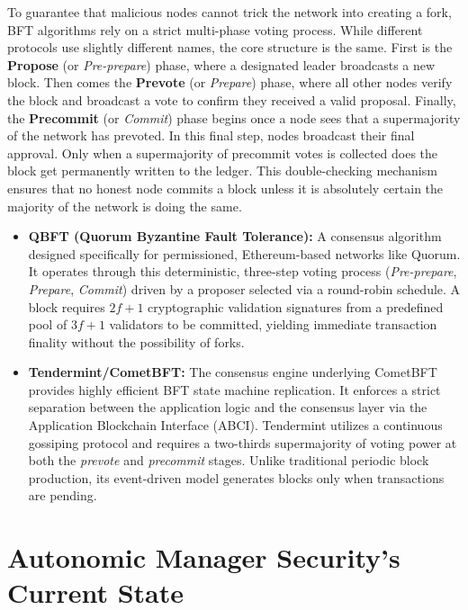 To guarantee that malicious nodes cannot trick the network into creating a fork, BFT algorithms rely on a strict multi-phase voting process. While different protocols use slightly different names, the core structure is the same. First is the \textbf{Propose} (or \textit{Pre-prepare}) phase, where a designated leader broadcasts a new block. Then comes the \textbf{Prevote} (or \textit{Prepare}) phase, where all other nodes verify the block and broadcast a vote to confirm they received a valid proposal. Finally, the \textbf{Precommit} (or \textit{Commit}) phase begins once a node sees that a supermajority of the network has prevoted. In this final step, nodes broadcast their final approval. Only when a supermajority of precommit votes is collected does the block get permanently written to the ledger. This double-checking mechanism ensures that no honest node commits a block unless it is absolutely certain the majority of the network is doing the same.

\begin{itemize}
    \item \textbf{QBFT (Quorum Byzantine Fault Tolerance):} A consensus algorithm designed specifically for permissioned, Ethereum-based networks like Quorum. It operates through this deterministic, three-step voting process (\textit{Pre-prepare}, \textit{Prepare}, \textit{Commit}) driven by a proposer selected via a round-robin schedule. A block requires $2f + 1$ cryptographic validation signatures from a predefined pool of $3f + 1$ validators to be committed, yielding immediate transaction finality without the possibility of forks.
    \item \textbf{Tendermint/CometBFT:} The consensus engine underlying CometBFT provides highly efficient BFT state machine replication. It enforces a strict separation between the application logic and the consensus layer via the Application Blockchain Interface (ABCI). Tendermint utilizes a continuous gossiping protocol and requires a two-thirds supermajority of voting power at both the \textit{prevote} and \textit{precommit} stages. Unlike traditional periodic block production, its event-driven model generates blocks only when transactions are pending.
\end{itemize}

\section{Autonomic Manager Security's Current State}
\label{sec:tech_state_of_art}

